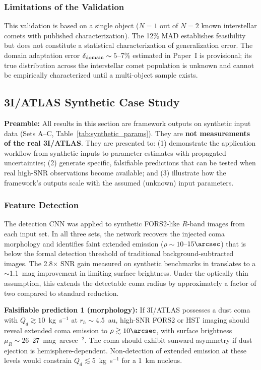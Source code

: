 \documentclass[usenatbib]{mnras}
\begin{document}
\subsubsection{Limitations of the Validation}

This validation is based on a single object ($N=1$ out of $N=2$ known interstellar comets with published characterization). The 12\% MAD establishes feasibility but does not constitute a statistical characterization of generalization error. The domain adaptation error $\delta_{\rm domain} \sim 5$--7\% estimated in Paper~I is provisional; its true distribution across the interstellar comet population is unknown and cannot be empirically characterized until a multi-object sample exists.

\subsection{3I/ATLAS Synthetic Case Study}\label{sec:atlas}

\textbf{Preamble:} All results in this section are framework outputs on synthetic input data (Sets A--C, Table~\ref{tab:synthetic_params}). They are \textbf{not measurements of the real 3I/ATLAS}. They are presented to: (1) demonstrate the application workflow from synthetic inputs to parameter estimates with propagated uncertainties; (2) generate specific, falsifiable predictions that can be tested when real high-SNR observations become available; and (3) illustrate how the framework's outputs scale with the assumed (unknown) input parameters.

\subsubsection{Feature Detection}

The detection CNN was applied to synthetic FORS2-like $R$-band images from each input set. In all three sets, the network recovers the injected coma morphology and identifies faint extended emission ($\rho \sim 10$--$15\arcsec$) that is below the formal detection threshold of traditional background-subtracted images. The 2.8$\times$ SNR gain measured on synthetic benchmarks in \citet{paperI} translates to a $\sim$1.1~mag improvement in limiting surface brightness. Under the optically thin assumption, this extends the detectable coma radius by approximately a factor of two compared to standard reduction.

\textbf{Falsifiable prediction 1 (morphology):} If 3I/ATLAS possesses a dust coma with $Q_d \gtrsim 10$~kg~s$^{-1}$ at $r_h \sim 4.5$~au, high-SNR FORS2 or HST imaging should reveal extended coma emission to $\rho \gtrsim 10\arcsec$, with surface brightness $\mu_R \sim 26$--27~mag~arcsec$^{-2}$. The coma should exhibit sunward asymmetry if dust ejection is hemisphere-dependent. Non-detection of extended emission at these levels would constrain $Q_d \lesssim 5$~kg~s$^{-1}$ for a 1~km nucleus.
\end{document}
